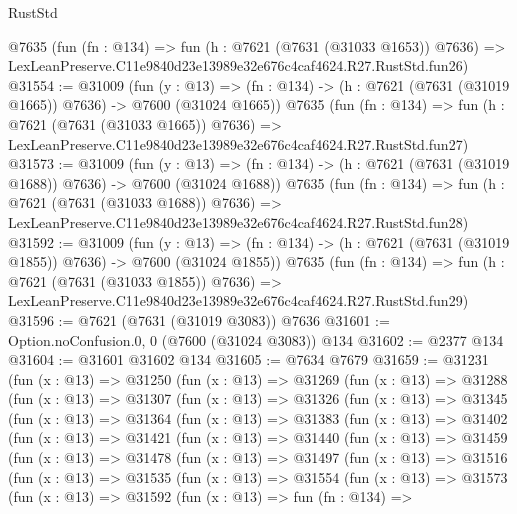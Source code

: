 \begin{lexlean}{RustStd}
\begin{coremodule}
    @7635
    (fun (fn : @134) =>
    fun (h : @7621 (@7631 (@31033 @1653)) @7636) =>
    LexLeanPreserve.C11e9840d23e13989e32e676c4caf4624.R27.RustStd.fun26)
@31554 := @31009
    (fun (y : @13) =>
    (fn : @134) -> (h : @7621 (@7631 (@31019 @1665)) @7636) -> @7600 (@31024 @1665))
    @7635
    (fun (fn : @134) =>
    fun (h : @7621 (@7631 (@31033 @1665)) @7636) =>
    LexLeanPreserve.C11e9840d23e13989e32e676c4caf4624.R27.RustStd.fun27)
@31573 := @31009
    (fun (y : @13) =>
    (fn : @134) -> (h : @7621 (@7631 (@31019 @1688)) @7636) -> @7600 (@31024 @1688))
    @7635
    (fun (fn : @134) =>
    fun (h : @7621 (@7631 (@31033 @1688)) @7636) =>
    LexLeanPreserve.C11e9840d23e13989e32e676c4caf4624.R27.RustStd.fun28)
@31592 := @31009
    (fun (y : @13) =>
    (fn : @134) -> (h : @7621 (@7631 (@31019 @1855)) @7636) -> @7600 (@31024 @1855))
    @7635
    (fun (fn : @134) =>
    fun (h : @7621 (@7631 (@31033 @1855)) @7636) =>
    LexLeanPreserve.C11e9840d23e13989e32e676c4caf4624.R27.RustStd.fun29)
@31596 := @7621 (@7631 (@31019 @3083)) @7636
@31601 := Option.noConfusion.{0, 0} (@7600 (@31024 @3083)) @134
@31602 := @2377 @134
@31604 := @31601 @31602 @134
@31605 := @7634 @7679
@31659 := @31231
    (fun (x : @13) =>
    @31250
      (fun (x : @13) =>
      @31269
        (fun (x : @13) =>
        @31288
          (fun (x : @13) =>
          @31307
            (fun (x : @13) =>
            @31326
              (fun (x : @13) =>
              @31345
                (fun (x : @13) =>
                @31364
                  (fun (x : @13) =>
                  @31383
                    (fun (x : @13) =>
                    @31402
                      (fun (x : @13) =>
                      @31421
                        (fun (x : @13) =>
                        @31440
                          (fun (x : @13) =>
                          @31459
                            (fun (x : @13) =>
                            @31478
                              (fun (x : @13) =>
                              @31497
                                (fun (x : @13) =>
                                @31516
                                  (fun (x : @13) =>
                                  @31535
                                    (fun (x : @13) =>
                                    @31554
                                      (fun (x : @13) =>
                                      @31573
                                        (fun (x : @13) =>
                                        @31592
                                          (fun (x : @13) =>
                                          fun (fn : @134) =>

\end{coremodule}
\end{lexlean}
